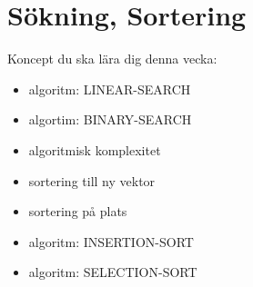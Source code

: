 \chapter{Sökning, Sortering}\label{chapter:W10}
Koncept du ska lära dig denna vecka:
\begin{multicols}{2}\begin{itemize}[nosep,label={$\square$},leftmargin=*]
\item algoritm: LINEAR-SEARCH
\item algortim: BINARY-SEARCH
\item algoritmisk komplexitet
\item sortering till ny vektor
\item sortering på plats
\item algoritm: INSERTION-SORT
\item algoritm: SELECTION-SORT\end{itemize}\end{multicols}
